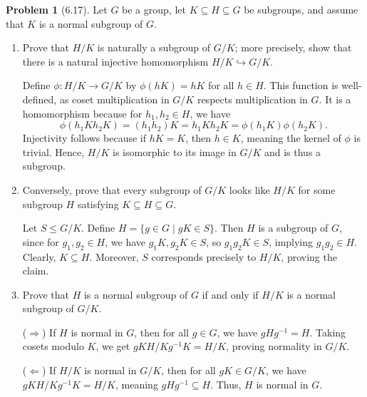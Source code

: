 \documentclass[12pt]{article}
\theoremstyle{definition}
\newtheorem{problem}{Problem}
\begin{document}
\begin{problem}[6.17]
    Let $G$ be a group, let $K \subseteq H \subseteq G$ be subgroups, and assume that $K$ is a normal subgroup of $G$.
    \begin{enumerate}[label=(\alph*)]
        \item Prove that $H/K$ is naturally a subgroup of $G/K$; more precisely, show that there is a natural injective homomorphism $H/K \hookrightarrow G/K$.
        
        \begin{solution}
            Define $\phi: H/K \to G/K$ by $\phi(hK) = hK$ for all $h \in H$. This function is well-defined, as coset multiplication in $G/K$ respects multiplication in $G$. It is a homomorphism because for $h_1, h_2 \in H$, we have
            \[
            \phi(h_1K h_2K) = (h_1 h_2)K = h_1K h_2K = \phi(h_1K) \phi(h_2K).
            \]
            Injectivity follows because if $hK = K$, then $h \in K$, meaning the kernel of $\phi$ is trivial. Hence, $H/K$ is isomorphic to its image in $G/K$ and is thus a subgroup.
        \end{solution}

        \item Conversely, prove that every subgroup of $G/K$ looks like $H/K$ for some subgroup $H$ satisfying $K \subseteq H \subseteq G$.
        
        \begin{solution}
            Let $S \leq G/K$. Define $H = \{ g \in G \mid gK \in S \}$. Then $H$ is a subgroup of $G$, since for $g_1, g_2 \in H$, we have $g_1K, g_2K \in S$, so $g_1 g_2 K \in S$, implying $g_1 g_2 \in H$. Clearly, $K \subseteq H$. Moreover, $S$ corresponds precisely to $H/K$, proving the claim.
        \end{solution}

        \item Prove that $H$ is a normal subgroup of $G$ if and only if $H/K$ is a normal subgroup of $G/K$.
        
        \begin{solution}
            ($\Rightarrow$) If $H$ is normal in $G$, then for all $g \in G$, we have $gH g^{-1} = H$. Taking cosets modulo $K$, we get $gK H/K g^{-1}K = H/K$, proving normality in $G/K$.
            
            ($\Leftarrow$) If $H/K$ is normal in $G/K$, then for all $gK \in G/K$, we have $gK H/K g^{-1}K = H/K$, meaning $gHg^{-1} \subseteq H$. Thus, $H$ is normal in $G$.
        \end{solution}


\end{enumerate}
\end{problem}
\end{document}
